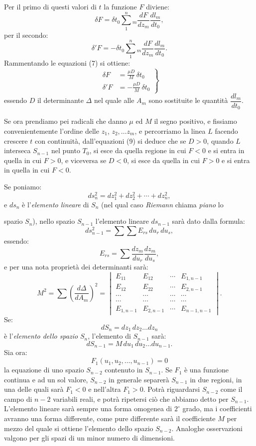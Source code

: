 \documentclass{article}
\begin{document}
Per il primo di questi valori di $t$ la funzione $F$ diviene:
\[ \delta F = \delta t_{0}\sum_{1}^{n}{}_{m}\frac{dF}{dz_{m}}\frac{dl_{m}}{dt_{0}}, \]
per il secondo:
\[ \delta' F = -\delta t_{0}\sum_{1}^{n}{}_{m}\frac{dF}{dz_{m}}\frac{dl_{m}}{dt_{0}}. \]
Rammentando le equazioni (7) si ottiene:
\[
\left.
\begin{aligned}
\delta F &= \frac{\mu D}{M}\,\delta t_{0}\\[4pt]
\delta' F &= -\frac{\mu D}{M}\,\delta t_{0}
\end{aligned}
\right\}
\tag{9}
\]
essendo $D$ il determinante $\Delta$ nel quale alle $A_{m}$ sono sostituite le quantità $\dfrac{dl_{m}}{dt_{0}}$.

Se ora prendiamo pei radicali che danno $\mu$ ed $M$ il segno positivo, e fissiamo convenientemente l'ordine delle $z_{1}$, $z_{2},\ldots z_{m}$, e percorriamo la linea $L$ facendo crescere $t$ con continuità, dall'equazioni (9) si deduce che se $D > 0$, quando $L$ interseca $S_{n-1}$ nel punto $T_{0}$, si esce da quella regione in cui $F < 0$ e si entra in quella in cui $F > 0$, e viceversa se $D < 0$, si esce da quella in cui $F > 0$ e si entra in quella in cui $F < 0$.

Se poniamo:
\[ ds_{n}^{2} = dz_{1}^{2} + dz_{2}^{2} + \cdots + dz_{n}^{2}, \]
e $ds_{n}$ è l'\emph{elemento lineare} di $S_{n}$ (nel qual caso \emph{Riemann} chiama \emph{piano} lo

spazio $S_{n}$), nello spazio $S_{n-1}$ l'elemento lineare $ds_{n-1}$ sarà dato dalla formula:
\[ ds_{n-1}^{2} = \sum\sum E_{rs}\,du_{r}\,du_{s}, \]
essendo:
\[ E_{rs} = \sum \frac{dz_{m}}{du_{r}}\frac{dz_{m}}{du_{s}}, \]
e per una nota proprietà dei determinanti sarà:
\[
M^{2} = \sum\left(\frac{d\Delta}{dA_{m}}\right)^{2} =
\begin{vmatrix}
E_{11} & E_{12} & \cdots & E_{1,n-1}\\
E_{12} & E_{22} & \cdots & E_{2,n-1}\\
\cdots & \cdots & \cdots & \cdots\\
\cdots & \cdots & \cdots & \cdots\\
E_{1,n-1} & E_{2,n-1} & \cdots & E_{n-1,n-1}
\end{vmatrix}.
\tag{10}
\]
Se:
\[ dS_{n} = dz_{1}\,dz_{2}\ldots dz_{n} \]
è l'\emph{elemento dello spazio} $S_{n}$, l'elemento di $S_{n-1}$ sarà:
\[ dS_{n-1} = M\,du_{1}\,du_{2}\ldots du_{n-1}. \tag{11} \]
Sia ora:
\[ F_{1}(u_{1}, u_{2},\ldots, u_{n-1}) = 0 \]
la equazione di uno spazio $S_{n-2}$ contenuto in $S_{n-1}$. Se $F_{1}$ è una funzione continua e ad un sol valore, $S_{n-2}$ in generale separerà $S_{n-1}$ in due regioni, in una delle quali sarà $F_{1} < 0$ e nell'altra $F_{1} > 0$. Potrà riguardarsi $S_{n-2}$ come il campo di $n-2$ variabili reali, e potrà ripetersi ciò che abbiamo detto per $S_{n-1}$. L'elemento lineare sarà sempre una forma omogenea di $2^{\circ}$ grado, ma i coefficienti avranno una forma differente, come pure differente sarà il coefficiente $M$ per mezzo del quale si ottiene l'elemento dello spazio $S_{n-2}$. Analoghe osservazioni valgono per gli spazi di un minor numero di dimensioni.
\end{document}
